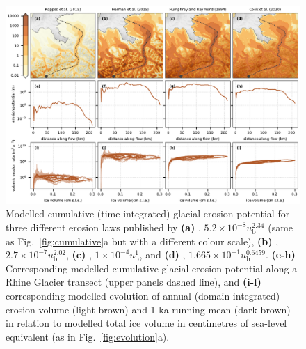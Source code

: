 \documentclass[esurf, manuscript]{copernicus}
\begin{document}
    \begin{figure}[ht]
      \centerline{\includegraphics{alpero_powerlaws}}
      \caption{%
        Modelled cumulative (time-integrated) glacial erosion potential for
        three different erosion laws published by
        \textbf{(a)} \citet{Koppes.etal.2015},
          ${5.2 \times 10^{-8} u_\mathrm{b}^{2.34}}$ (same as
          Fig.~\ref{fig:cumulative}a but with a different colour scale),
        \textbf{(b)} \citet{Herman.etal.2015},
          ${2.7 \times 10^{-7} u_\mathrm{b}^{2.02}}$,
        \textbf{(c)} \citet{Humphrey.Raymond.1994},
          ${1 \times 10^{-4} u_\mathrm{b}^{1}}$, and
        \textbf{(d)} \citet{Cook.etal.2020},
          ${1.665 \times 10^{-1} u_\mathrm{b}^{0.6459}}$.
        \textbf{(e-h)} Corresponding modelled cumulative glacial erosion
          potential along a Rhine Glacier transect (upper panels dashed line), and
        \textbf{(i-l)} corresponding modelled evolution of annual
        (domain-integrated) erosion volume (light brown) and 1-ka
        running mean (dark brown) in relation to modelled total ice volume in
        centimetres of sea-level equivalent (as in Fig.~\ref{fig:evolution}a).}
      \label{fig:powerlaws}
    \end{figure}
\end{document}
